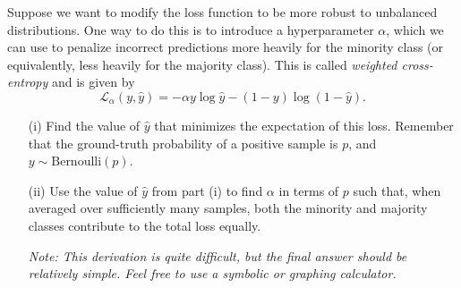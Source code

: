 \documentclass[11pt]{article}
\begin{document}
\begin{subparts}
        \subpart Suppose we want to modify the loss function to be more robust to unbalanced distributions. One way to do this is to introduce a hyperparameter $\alpha$, which we can use to penalize incorrect predictions more heavily for the minority class (or equivalently, less heavily for the majority class). This is called \emph{weighted cross-entropy} and is given by
        $$
        \mathcal{L}_\alpha(y, \hat{y}) = - \alpha y \log \hat{y} - (1 - y) \log (1 - \hat{y}).
        $$
        \begin{enumerate}
            \item[(i)] Find the value of $\hat{y}$ that minimizes the expectation of this loss. Remember that the ground-truth probability of a positive sample is $p$, and $y \sim \text{Bernoulli}(p)$.
            
            
            \item[(ii)] Use the value of $\hat{y}$ from part (i) to find $\alpha$ in terms of $p$ such that, when averaged over sufficiently many samples, both the minority and majority classes contribute to the total loss equally.
            
            \emph{Note: This derivation is quite difficult, but the final answer should be relatively simple. Feel free to use a symbolic or graphing calculator.}
            

\end{enumerate}
\end{subparts}
\end{document}
